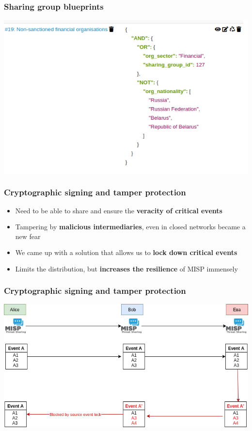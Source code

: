 \begin{frame}
\frametitle{Sharing group blueprints}
\includegraphics[scale=0.6]{images/blueprints2.png}
\end{frame}

\begin{frame}
  \frametitle{Cryptographic signing and tamper protection}
  \begin{itemize}
     \item Need to be able to share and ensure the {\bf veracity of critical events}
     \item Tampering by {\bf malicious intermediaries}, even in closed networks became a new fear
     \item We came up with a solution that allows us to {\bf lock down critical events}
     \item Limits the distribution, but {\bf increases the resilience} of MISP immensely
  \end{itemize}
\end{frame}

\begin{frame}
\frametitle{Cryptographic signing and tamper protection}
\includegraphics[scale=0.5]{images/signing1.png}
\end{frame}

